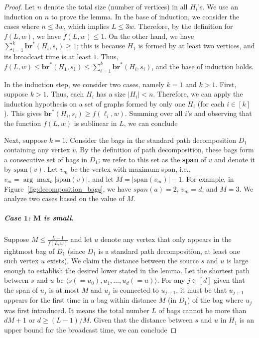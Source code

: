 \documentclass[letterpaper,11pt]{article}
\newcommand{\bropt}{{\boldsymbol{br}^*}}
\newcommand{\bigell}{L}
\newcommand{\pwidth}{w}
\newcommand{\sspan}{\text{span}}
\begin{document}
\begin{proof}
    Let $n$ denote the total size (number of vertices) in all $H_i$'s. We use an induction on $n$ to prove the lemma. In the base of induction, we consider the cases where $n\leq 3\pwidth$, which implies $\bigell \leq 3\pwidth$. Therefore, by the definition for $f(\bigell, \pwidth)$, we have $f(\bigell, \pwidth)\leq 1$. 
    On the other hand, we have $\sum_{i=1}^k \bropt(H_i, s_i) \geq 1$; this is because $H_1$ is formed by at least two vertices, and its broadcast time is at least $1$. Thus, $f(\bigell,\pwidth) \leq \bropt(H_1,s_1) \leq \sum_{i=1}^k \bropt(H_i,s_i)$, and the base of induction holds. 

    In the induction step, we consider two cases, namely $k=1$ and $k>1$.
First, suppose $k>1$. Thus, each $H_i$ has a size $|H_i|< n$. 
    Therefore, we can apply the induction hypothesis on a set of graphs formed by only one $H_i$ (for each $i\in [k]$). This gives $\bropt(H_i,s_i) \geq f(\ell_i,\pwidth)$. 
    Summing over all $i$'s and observing that the function $f(\bigell, \pwidth)$ is sublinear in $\bigell$, we can conclude

\scalebox{.9}{
    \begin{minipage}{1.2\textwidth}
        \begin{align*}
            \sum_{i=1}^k \bropt(H_i, s_i) \geq \sum_{i=1}^k f(\ell_i,\pwidth) \geq f(\bigell,\pwidth).
        \end{align*}
        \vspace{1mm}
\end{minipage}}
    Next, suppose $k=1$. Consider the bags in the standard path decomposition $D_1$ containing any vertex $v$. By the definition of path decomposition, these bags form a consecutive set of bags in $D_1$; we refer to this set as the \textbf{span} of $v$ and denote it by $\sspan(v)$. Let $v_m$ be the vertex with maximum span, i.e., $v_m = \arg \max_v |\sspan(v)|$, and let $M=|\sspan(v_{m})|-1$. For example, in Figure~\ref{fig:decomposition_bags}, we have $span(a) = 2$, $v_m = d$, and $M=3$. We analyze two cases based on the value of $M$. 

    \subparagraph*{Case $\mathbf{1}$: $\mathbf{M}$ is small.}  Suppose $M \leq \frac{\bigell - 1}{f(\bigell, \pwidth)}$ and let $u$ denote any vertex that only appears in the rightmost bag of $D_1$ (since $D_1$ is a standard path decomposition, at least one such vertex $u$ exists). We claim the distance between the source $s$ and $u$ is large enough to establish the desired lower stated in the lemma. Let the shortest path between $ s$ and $u$ be $\langle s(=u_0), u_1,\ldots, u_d(=u)\rangle$. For any $j\in[d]$ given that the span of $u_j$ is at most $M$ and $u_j$ is connected to $u_{j+1}$, it must be that $u_{j+1}$ appears for the first time in a bag within distance $M$ (in $D_1$) of the bag where $u_j$ was first introduced. It means the total number $\bigell$ of bags cannot be more than $dM+1$ or $d\geq (\bigell-1)/M$. Given that the distance between $s$ and $u$ in $H_1$ is an upper bound for the broadcast time, we can conclude 


\end{proof}
\end{document}
